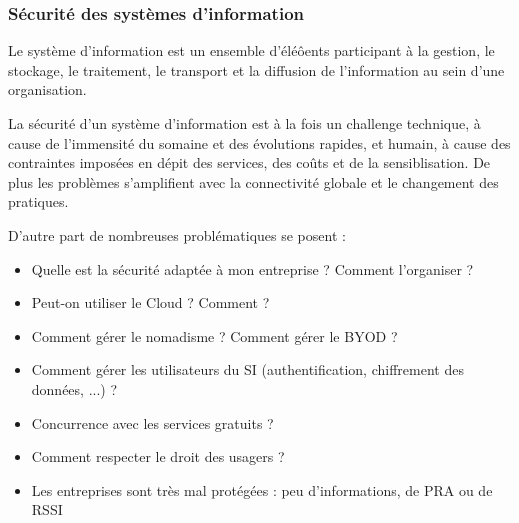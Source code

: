 \documentclass[12pt, a4paper]{article}
\begin{document}
	\subsubsection{Sécurité des systèmes d'information}
	Le système d'information est un ensemble d'éléôents participant à la gestion, le stockage, le traitement, le transport et la diffusion de l'information au sein d'une organisation.
	\par
	La sécurité d'un système d'information est à la fois un challenge technique, à cause de l'immensité du somaine et des évolutions rapides, et humain, à cause des contraintes imposées en dépit des services, des coûts et de la sensiblisation. De plus les problèmes s'amplifient avec la connectivité globale et le changement des pratiques.
	\par
	D'autre part de nombreuses problématiques se posent :
	\begin{itemize}
		\item Quelle est la sécurité adaptée à mon entreprise ? Comment l'organiser ?
		\item Peut-on utiliser le Cloud ? Comment ?
		\item Comment gérer le nomadisme ? Comment gérer le BYOD ?
		\item Comment gérer les utilisateurs du SI (authentification, chiffrement des données, ...) ?
		\item Concurrence avec les services gratuits ?
		\item Comment respecter le droit des usagers ?
		\item Les entreprises sont très mal protégées : peu d'informations, de PRA ou de RSSI
	\end{itemize}
\end{document}
